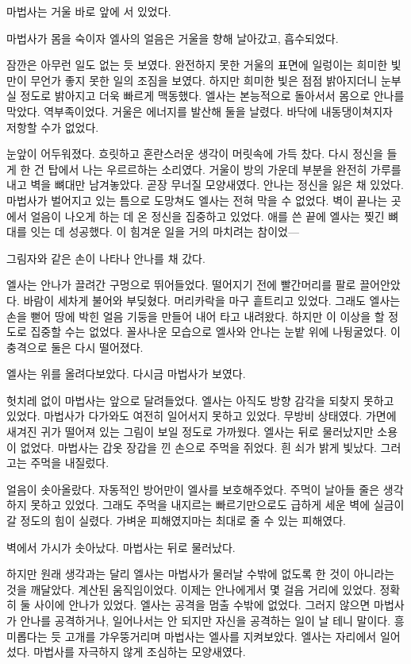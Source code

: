 마법사는 거울 바로 앞에 서 있었다.

마법사가 몸을 숙이자 엘사의 얼음은 거울을 향해 날아갔고, 흡수되었다.

잠깐은 아무런 일도 없는 듯 보였다. 완전하지 못한 거울의 표면에 일렁이는 희미한 빛만이 무언가 좋지 못한 일의 조짐을 보였다. 하지만 희미한 빛은 점점 밝아지더니 눈부실 정도로 밝아지고 더욱 빠르게 맥동했다. 엘사는 본능적으로 돌아서서 몸으로 안나를 막았다. 역부족이었다. 거울은 에너지를 발산해 둘을 날렸다. 바닥에 내동댕이쳐지자 저항할 수가 없었다.

눈앞이 어두워졌다. 흐릿하고 혼란스러운 생각이 머릿속에 가득 찼다. 다시 정신을 들게 한 건 탑에서 나는 우르르하는 소리였다. 거울이 방의 가운데 부분을 완전히 가루를 내고 벽을 뼈대만 남겨놓았다. 곧장 무너질 모양새였다. 안나는 정신을 잃은 채 있었다. 마법사가 벌어지고 있는 틈으로 도망쳐도 엘사는 전혀 막을 수 없었다. 벽이 끝나는 곳에서 얼음이 나오게 하는 데 온 정신을 집중하고 있었다. 애를 쓴 끝에 엘사는 찢긴 뼈대를 잇는 데 성공했다. 이 힘겨운 일을 거의 마치려는 참이었—

그림자와 같은 손이 나타나 안나를 채 갔다.

엘사는 안나가 끌려간 구멍으로 뛰어들었다. 떨어지기 전에 빨간머리를 팔로 끌어안았다. 바람이 세차게 불어와 부딪혔다. 머리카락을 마구 흩트리고 있었다. 그래도 엘사는 손을 뻗어 땅에 박힌 얼음 기둥을 만들어 내어 타고 내려왔다. 하지만 이 이상을 할 정도로 집중할 수는 없었다. 꼴사나운 모습으로 엘사와 안나는 눈밭 위에 나뒹굴었다. 이 충격으로 둘은 다시 떨어졌다.

엘사는 위를 올려다보았다. 다시금 마법사가 보였다.

헛치레 없이 마법사는 앞으로 달려들었다. 엘사는 아직도 방향 감각을 되찾지 못하고 있었다. 마법사가 다가와도 여전히 일어서지 못하고 있었다. 무방비 상태였다. 가면에 새겨진 귀가 떨어져 있는 그림이 보일 정도로 가까웠다. 엘사는 뒤로 물러났지만 소용이 없었다. 마법사는 갑옷 장갑을 낀 손으로 주먹을 쥐었다. 흰 쇠가 밝게 빛났다. 그러고는 주먹을 내질렀다.

얼음이 솟아올랐다. 자동적인 방어만이 엘사를 보호해주었다. 주먹이 날아들 줄은 생각하지 못하고 있었다. 그래도 주먹을 내지르는 빠르기만으로도 급하게 세운 벽에 실금이 갈 정도의 힘이 실렸다. 가벼운 피해였지마는 최대로 줄 수 있는 피해였다.

벽에서 가시가 솟아났다. 마법사는 뒤로 물러났다.

하지만 원래 생각과는 달리 엘사는 마법사가 물러날 수밖에 없도록 한 것이 아니라는 것을 깨달았다. 계산된 움직임이었다. 이제는 안나에게서 몇 걸음 거리에 있었다. 정확히 둘 사이에 안나가 있었다. 엘사는 공격을 멈출 수밖에 없었다. 그러지 않으면 마법사가 안나를 공격하거나, 일어나서는 안 되지만 자신을 공격하는 일이 날 테니 말이다. 흥미롭다는 듯 고개를 갸우뚱거리며 마법사는 엘사를 지켜보았다. 엘사는 자리에서 일어섰다. 마법사를 자극하지 않게 조심하는 모양새였다.

